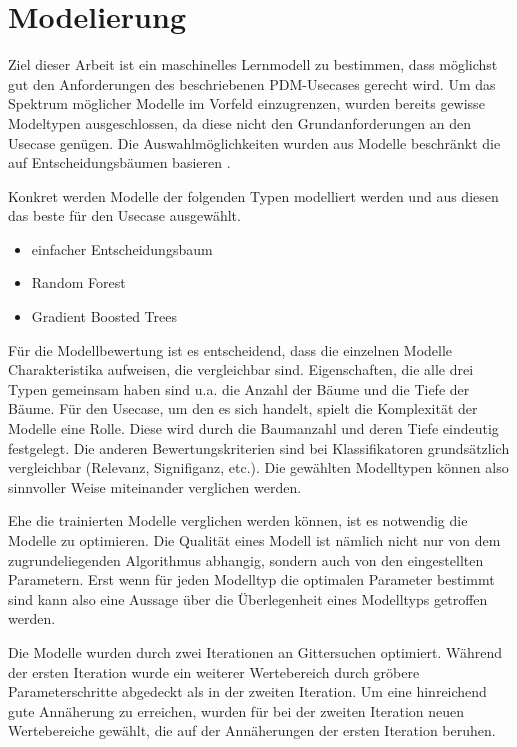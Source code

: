 \chapter{Modelierung}
\label{ch:modelierung}

Ziel dieser Arbeit ist ein maschinelles Lernmodell zu bestimmen, dass möglichst gut den Anforderungen des beschriebenen PDM-Usecases gerecht wird. Um das Spektrum möglicher Modelle im Vorfeld einzugrenzen, wurden bereits gewisse Modeltypen ausgeschlossen, da diese nicht den Grundanforderungen an den Usecase genügen. Die Auswahlmöglichkeiten wurden aus Modelle beschränkt die auf Entscheidungsbäumen basieren .

Konkret werden Modelle der folgenden Typen modelliert werden und aus diesen das beste für den Usecase ausgewählt.
\begin{itemize}
    \item einfacher Entscheidungsbaum
    \item Random Forest
    \item Gradient Boosted Trees
\end{itemize}

Für die Modellbewertung ist es entscheidend, dass die einzelnen Modelle Charakteristika aufweisen, die vergleichbar sind. Eigenschaften, die alle drei Typen gemeinsam haben sind u.a. die Anzahl der Bäume und die Tiefe der Bäume. Für den Usecase, um den es sich handelt, spielt die Komplexität der Modelle eine Rolle. Diese wird durch die Baumanzahl und deren Tiefe eindeutig festgelegt. Die anderen Bewertungskriterien sind bei Klassifikatoren grundsätzlich vergleichbar (Relevanz, Signifiganz, etc.).
Die gewählten Modelltypen können also sinnvoller Weise miteinander verglichen werden. 

Ehe die trainierten Modelle verglichen werden können, ist es notwendig die Modelle zu optimieren. Die Qualität eines Modell ist nämlich nicht nur von dem zugrundeliegenden Algorithmus abhangig, sondern auch von den eingestellten Parametern. Erst wenn für jeden Modelltyp die optimalen Parameter bestimmt sind kann also eine Aussage über die Überlegenheit eines Modelltyps getroffen werden.

Die Modelle wurden durch zwei Iterationen an Gittersuchen optimiert. Während der ersten Iteration wurde ein weiterer Wertebereich durch gröbere Parameterschritte abgedeckt als in der zweiten Iteration. Um eine hinreichend gute Annäherung zu erreichen, wurden für bei der zweiten Iteration neuen Wertebereiche gewählt, die auf der Annäherungen der ersten Iteration beruhen.




